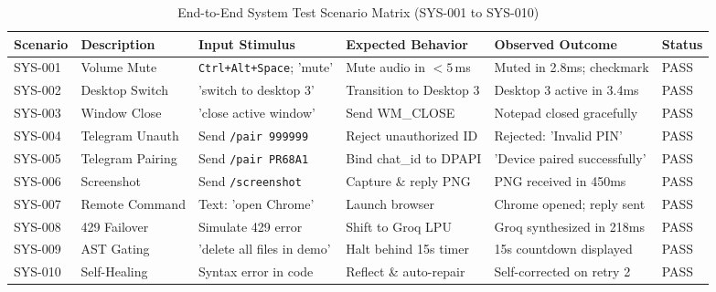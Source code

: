 \documentclass[12pt,letterpaper,oneside]{report}
\begin{document}
\begin{table}[H]
\centering
\caption{End-to-End System Test Scenario Matrix (SYS-001 to SYS-010)}
\label{tab:e2e_scenarios}
\begin{tabularx}{\textwidth}{|l|l|X|X|X|l|}
\hline
\textbf{Scenario} & \textbf{Description} & \textbf{Input Stimulus} & \textbf{Expected Behavior} & \textbf{Observed Outcome} & \textbf{Status}\\ \hline
SYS-001 & Volume Mute & \texttt{Ctrl+Alt+Space}; 'mute' & Mute audio in $<5$\,ms & Muted in 2.8ms; checkmark & PASS\\ \hline
SYS-002 & Desktop Switch & 'switch to desktop 3' & Transition to Desktop 3 & Desktop 3 active in 3.4ms & PASS\\ \hline
SYS-003 & Window Close & 'close active window' & Send WM\_CLOSE & Notepad closed gracefully & PASS\\ \hline
SYS-004 & Telegram Unauth & Send \texttt{/pair 999999} & Reject unauthorized ID & Rejected: 'Invalid PIN' & PASS\\ \hline
SYS-005 & Telegram Pairing & Send \texttt{/pair PR68A1} & Bind chat\_id to DPAPI & 'Device paired successfully' & PASS\\ \hline
SYS-006 & Screenshot & Send \texttt{/screenshot} & Capture \& reply PNG & PNG received in 450ms & PASS\\ \hline
SYS-007 & Remote Command & Text: 'open Chrome' & Launch browser & Chrome opened; reply sent & PASS\\ \hline
SYS-008 & 429 Failover & Simulate 429 error & Shift to Groq LPU & Groq synthesized in 218ms & PASS\\ \hline
SYS-009 & AST Gating & 'delete all files in demo' & Halt behind 15s timer & 15s countdown displayed & PASS\\ \hline
SYS-010 & Self-Healing & Syntax error in code & Reflect \& auto-repair & Self-corrected on retry 2 & PASS\\ \hline
\end{tabularx}
\end{table}
\end{document}

